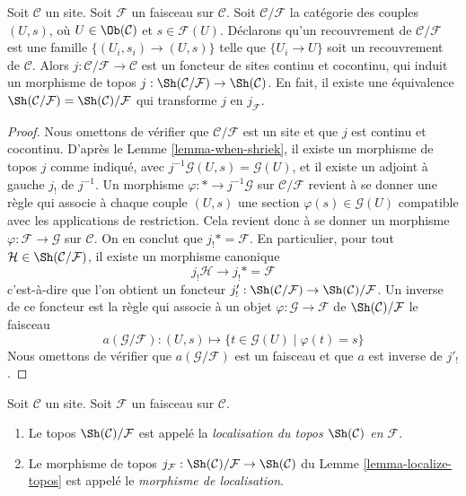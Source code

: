 \begin{lemma}
\label{lemma-localize-topos-site}
Soit $\mathcal{C}$ un site. Soit $\mathcal{F}$ un faisceau sur $\mathcal{C}$.
Soit $\mathcal{C}/\mathcal{F}$ la catégorie des couples $(U, s)$, où
$U \in \Ob(\mathcal{C})$ et $s \in \mathcal{F}(U)$. Déclarons qu’un
recouvrement de $\mathcal{C}/\mathcal{F}$ est une famille
$\{(U_i, s_i) \to (U, s)\}$ telle que $\{U_i \to U\}$ soit un recouvrement de
$\mathcal{C}$. Alors $j : \mathcal{C}/\mathcal{F} \to \mathcal{C}$ est un
foncteur de sites continu et cocontinu, qui induit un morphisme de topos
$j : \Sh(\mathcal{C}/\mathcal{F}) \to \Sh(\mathcal{C})$. En fait, il existe
une équivalence $\Sh(\mathcal{C}/\mathcal{F}) =
\Sh(\mathcal{C})/\mathcal{F}$ qui transforme $j$ en $j_\mathcal{F}$.
\end{lemma}

\begin{proof}
Nous omettons de vérifier que $\mathcal{C}/\mathcal{F}$ est un site et que
$j$ est continu et cocontinu. D’après le Lemme \ref{lemma-when-shriek}, il
existe un morphisme de topos $j$ comme indiqué, avec
$j^{-1}\mathcal{G}(U, s) = \mathcal{G}(U)$, et il existe un adjoint à gauche
$j_!$ de $j^{-1}$. Un morphisme $\varphi : * \to j^{-1}\mathcal{G}$ sur
$\mathcal{C}/\mathcal{F}$ revient à se donner une règle qui associe à chaque
couple $(U, s)$ une section $\varphi(s) \in \mathcal{G}(U)$ compatible avec les
applications de restriction. Cela revient donc à se donner un morphisme
$\varphi : \mathcal{F} \to \mathcal{G}$ sur $\mathcal{C}$.
On en conclut que $j_!* = \mathcal{F}$. En particulier, pour tout
$\mathcal{H} \in \Sh(\mathcal{C}/\mathcal{F})$, il existe un morphisme
canonique
$$
j_!\mathcal{H} \to j_!* = \mathcal{F}
$$
c’est-à-dire que l’on obtient un foncteur
$j'_! : \Sh(\mathcal{C}/\mathcal{F}) \to
\Sh(\mathcal{C})/\mathcal{F}$.
Un inverse de ce foncteur est la règle qui associe à un objet
$\varphi : \mathcal{G} \to \mathcal{F}$ de
$\Sh(\mathcal{C})/\mathcal{F}$ le faisceau
$$
a(\mathcal{G}/\mathcal{F}) :
(U, s) \longmapsto \{t \in \mathcal{G}(U) \mid \varphi(t) = s\}
$$
Nous omettons de vérifier que $a(\mathcal{G}/\mathcal{F})$ est un faisceau et
que $a$ est inverse de $j'_!$.
\end{proof}

\begin{definition}
\label{definition-localize-topos}
Soit $\mathcal{C}$ un site.
Soit $\mathcal{F}$ un faisceau sur $\mathcal{C}$.
\begin{enumerate}
\item Le topos $\Sh(\mathcal{C})/\mathcal{F}$ est appelé la
{\it localisation du topos $\Sh(\mathcal{C})$ en $\mathcal{F}$}.
\item Le morphisme de topos
$j_\mathcal{F} :
\Sh(\mathcal{C})/\mathcal{F}
\to
\Sh(\mathcal{C})$ du
Lemme \ref{lemma-localize-topos}
est appelé le {\it morphisme de localisation}.
\end{enumerate}
\end{definition}

